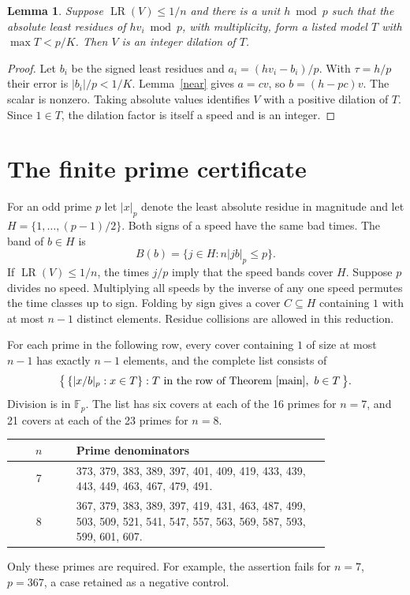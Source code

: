 \documentclass[11pt,a4paper]{article}
\newtheorem{lemma}[theorem]{Lemma}
\newcommand{\LR}{\operatorname{LR}}
\begin{document}
\begin{lemma}\label{lift}
Suppose $\LR(V)\le1/n$ and there is a unit $h\bmod p$ such that the
absolute least residues of $hv_i\bmod p$, with multiplicity, form a listed
model $T$ with $\max T<p/K$. Then $V$ is an integer dilation of $T$.
\end{lemma}
\begin{proof}
Let $b_i$ be the signed least residues and $a_i=(hv_i-b_i)/p$.
With $\tau=h/p$ their error is $|b_i|/p<1/K$. Lemma~\ref{near} gives
$a=cv$, so $b=(h-pc)v$. The scalar is nonzero. Taking absolute values
identifies $V$ with a positive dilation of $T$. Since $1\in T$, the dilation
factor is itself a speed and is an integer.
\end{proof}

\newpage
\section{The finite prime certificate}
For an odd prime $p$ let $|x|_p$ denote the least absolute residue in
magnitude and let $H=\{1,\ldots,(p-1)/2\}$. Both signs of a speed have
the same bad times. The band of $b\in H$ is
\[
 B(b)=\{j\in H:n|jb|_p\le p\}.
\]
If $\LR(V)\le1/n$, the times $j/p$ imply that the speed bands cover $H$.
Suppose $p$ divides no speed. Multiplying all speeds by the inverse of any
one speed permutes the time classes up to sign. Folding by sign gives a
cover $C\subseteq H$ containing $1$ with at most $n-1$ distinct elements.
Residue collisions are allowed in this reduction.

\medskip{}
For each prime in the following row, every cover containing $1$ of size
at most $n-1$ has exactly $n-1$ elements, and the complete list consists of
\begin{equation}\label{list}
 \big\{\,\{|x/b|_p:x\in T\}:T\text{ in the row of
 Theorem~\ref{main}},\ b\in T\,\big\}.
\end{equation}
Division is in $\mathbb F_p$. The list has six covers at each of the
16 primes for $n=7$, and 21 covers at each of the 23 primes for $n=8$.
\begin{center}\small
\begin{tabular}{c p{0.80\linewidth}}\toprule
$n$ & Prime denominators \\ \midrule
7 & 373, 379, 383, 389, 397, 401, 409, 419, 433, 439, 443, 449, 463, 467, 479, 491.\\[3pt]
8 & 367, 379, 383, 389, 397, 419, 431, 463, 487, 499, 503, 509, 521, 541, 547, 557, 563, 569, 587, 593, 599, 601, 607.\\
\bottomrule\end{tabular}
\end{center}
Only these primes are required. For example, the assertion fails for
$n=7$, $p=367$, a case retained as a negative control.
\end{document}
